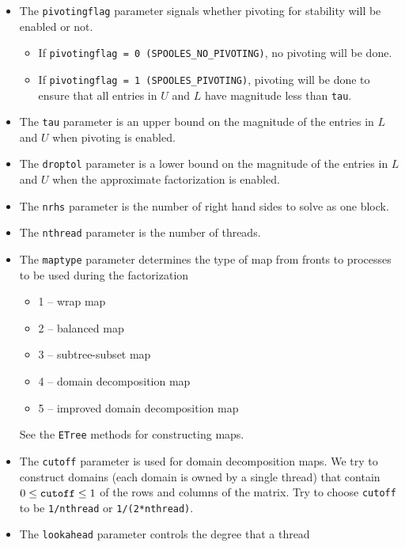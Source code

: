 \begin{enumerate}
\begin{itemize}
\begin{itemize}
{\tt sparsityflag = 1 (FRONTMTX\_SPARSE\_FRONTS)} implies an
approximate factorization.
The fronts will be stored as sparse submatrices, where
the entries in the triangular factors will be
subjected to a drop tolerance test --- if the magnitude of an entry
is {\tt droptol} or larger, it will be stored, otherwise it will be
dropped.
\end{itemize}
\item
The {\tt pivotingflag} parameter signals whether pivoting for
stability will be enabled or not.
\begin{itemize}
\item
If {\tt pivotingflag = 0 (SPOOLES\_NO\_PIVOTING)},
no pivoting will be done.
\item
If {\tt pivotingflag = 1 (SPOOLES\_PIVOTING)},
pivoting will be done to ensure that all
entries in $U$ and $L$ have magnitude less than {\tt tau}.
\end{itemize}
\item
The {\tt tau} parameter is an upper bound on the magnitude of the
entries in $L$ and $U$ when pivoting is enabled.
\item
The {\tt droptol} parameter is a lower bound on the magnitude of the
entries in $L$ and $U$ when the approximate factorization is enabled.
\item
The {\tt nrhs} parameter is the number of right hand sides to solve
as one block.
\item
The {\tt nthread} parameter is the number of threads.
\item
The {\tt maptype} parameter determines the type of map from fronts
to processes to be used during the factorization
\begin{itemize}
\item 1 -- wrap map
\item 2 -- balanced map
\item 3 -- subtree-subset map
\item 4 -- domain decomposition map
\item 5 -- improved domain decomposition map
\end{itemize}
See the {\tt ETree} methods for constructing maps.
\item
The {\tt cutoff} parameter is used for domain decomposition maps.
We try to construct domains (each domain is owned by a single
thread) that contain $0 \le {\tt cutoff} \le 1$ of the rows and
columns of the matrix.
Try to choose {\tt cutoff} to be {\tt 1/nthread}
or {\tt 1/(2*nthread)}.
\item
The {\tt lookahead} parameter controls the degree that a thread

\end{itemize}
\end{enumerate}
